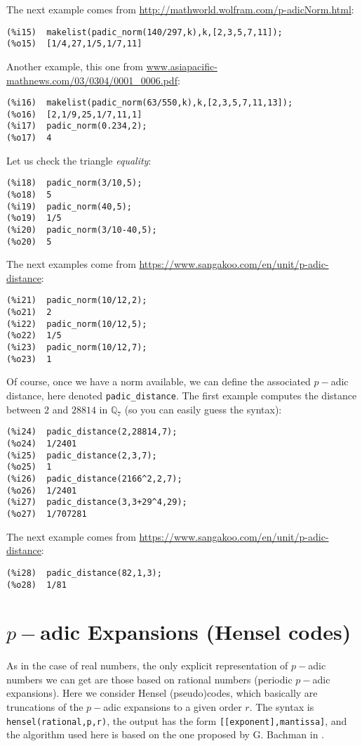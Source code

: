 \documentclass[fleqn]{cas-sc}
\begin{document}
The next example comes from \url{http://mathworld.wolfram.com/p-adicNorm.html}:
\begin{verbatim}
(%i15)	makelist(padic_norm(140/297,k),k,[2,3,5,7,11]);
(%o15)	[1/4,27,1/5,1/7,11]
\end{verbatim}

Another example, this one from \url{www.asiapacific-mathnews.com/03/0304/0001_0006.pdf}:
\begin{verbatim}
(%i16)	makelist(padic_norm(63/550,k),k,[2,3,5,7,11,13]);
(%o16)	[2,1/9,25,1/7,11,1]
(%i17)	padic_norm(0.234,2);
(%o17)	4
\end{verbatim}

Let us check the triangle \emph{equality}:
\begin{verbatim}
(%i18)	padic_norm(3/10,5);
(%o18)	5
(%i19)	padic_norm(40,5);
(%o19)	1/5
(%i20)	padic_norm(3/10-40,5);
(%o20)	5
\end{verbatim}

The next examples come from \url{https://www.sangakoo.com/en/unit/p-adic-distance}:
\begin{verbatim}
(%i21)	padic_norm(10/12,2);
(%o21)	2
(%i22)	padic_norm(10/12,5);
(%o22)	1/5
(%i23)	padic_norm(10/12,7);
(%o23)	1
\end{verbatim}

Of course, once we have a norm available, we can define the
associated $p-$adic distance, here denoted \texttt{padic\_distance}.
The first example computes the distance between $2$ and $28814$ in
$\mathbb{Q}_7$ (so you can easily guess the syntax):
	
\begin{verbatim}
(%i24)	padic_distance(2,28814,7);
(%o24)	1/2401
(%i25)	padic_distance(2,3,7);
(%o25)	1
(%i26)	padic_distance(2166^2,2,7);
(%o26)	1/2401
(%i27)	padic_distance(3,3+29^4,29);
(%o27)	1/707281
\end{verbatim}
The next example comes from \url{https://www.sangakoo.com/en/unit/p-adic-distance}:

\begin{verbatim}
(%i28)	padic_distance(82,1,3);
(%o28)	1/81
\end{verbatim}

\section{$p-$adic Expansions (Hensel codes)}\label{sec3}

\noindent As in the case of real numbers, the only explicit representation of 
$p-$adic numbers we can get are those based on rational numbers (periodic $p-$adic
expansions). Here we consider Hensel (pseudo)codes, which basically are truncations
of the $p-$adic expansions to a given order $r$.
The syntax is \texttt{hensel(rational,p,r)}, the output has the form \texttt{[[exponent],mantissa]}, and the algorithm used
here is based on the one proposed by G. Bachman in \cite{1}.
\end{document}
